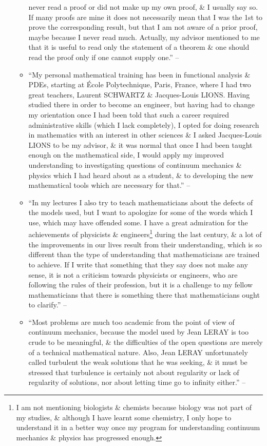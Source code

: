 \documentclass{article}
\begin{document}
\begin{enumerate}
\begin{itemize}
never read a proof or did not make up my own proof, \& I usually say so. If many proofs are mine it does not necessarily mean that I was the 1st to prove the corresponding result, but that I am not aware of a prior proof, maybe because I never read much. Actually, my advisor mentioned to me that it is useful to read only the statement of a theorem \& one should read the proof only if one cannot supply one.'' -- \cite[Preface, pp. xii--xiii]{Tartar2006}
		\item ``My personal mathematical training has been in functional analysis \& PDEs, starting at \'Ecole Polytechnique, Paris, France, where I had two great teachers, Laurent SCHWARTZ \& Jacques-Louis LIONS. Having studied there in order to become an engineer, but having had to change my orientation once I had been told that such a career required administrative skills (which I lack completely), I opted for doing research in mathematics with an interest in other sciences \& I asked Jacques-Louis LIONS to be my advisor, \& it was normal that once I had been taught enough on the mathematical side, I would apply my improved understanding to investigating questions of continuum mechanics \& physics which I had heard about as a student, \& to developing the new mathematical tools which are necessary for that.'' -- \cite[Preface, p. xiii]{Tartar2006}
		\item ``In my lectures I also try to teach mathematicians about the defects of the models used, but I want to apologize for some of the words which I use, which may have offended some. I have a great admiration for the achievements of physicists \& engineers\footnote{I am not mentioning biologists \& chemists because biology was not part of my studies, \& although I have learnt some chemistry, I only hope to understand it in a better way once my program for understanding continuum mechanics \& physics has progressed enough.} during the last century, \& a lot of the improvements in our lives result from their understanding, which is so different than the type of understanding that mathematicians are trained to achieve. If I write that something that they say does not make any sense, it is not a criticism towards physicists or engineers, who are following the rules of their profession, but it is a challenge to my fellow mathematicians that there is something there that mathematicians ought to clarify.'' -- \cite[Preface, p. xiii]{Tartar2006}
		\item ``Most problems are much too academic from the point of view of continuum mechanics, because the model used by Jean LERAY is too crude to be meaningful, \& the difficulties of the open questions are merely of a technical mathematical nature. Also, Jean LERAY unfortunately called turbulent the weak solutions that he was seeking, \& it must be stressed that turbulence is certainly not about regularity or lack of regularity of solutions, nor about letting time go to infinity either.'' -- \cite[Introduction, p. xv]{Tartar2006}

\end{itemize}
\end{enumerate}
\end{document}
